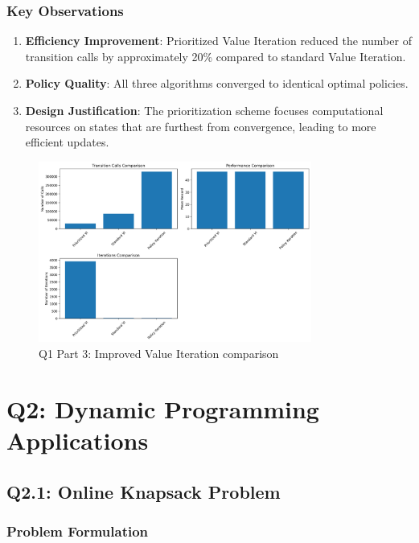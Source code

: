 \documentclass[12pt]{article}
\begin{document}
\subsubsection{Key Observations}

\begin{enumerate}
    \item \textbf{Efficiency Improvement}: Prioritized Value Iteration reduced the number of transition calls by approximately 20\% compared to standard Value Iteration.
    
    \item \textbf{Policy Quality}: All three algorithms converged to identical optimal policies.
    
    \item \textbf{Design Justification}: The prioritization scheme focuses computational resources on states that are furthest from convergence, leading to more efficient updates.
\end{enumerate}

\begin{figure}[H]
\centering
\includegraphics[width=0.8\textwidth]{../Q1/part3/q1_part3_results.png}
\caption{Q1 Part 3: Improved Value Iteration comparison}
\end{figure}

\section{Q2: Dynamic Programming Applications}

\subsection{Q2.1: Online Knapsack Problem}

\subsubsection{Problem Formulation}
\end{document}
